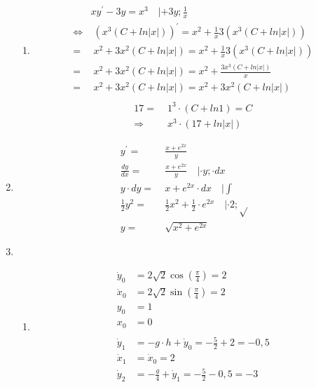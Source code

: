 \documentclass[]{book}
\theoremstyle{definition}
\begin{document}
\begin{enumerate}
\begin{enumerate}
        \item \begin{align*}
            & xy^{\prime} - 3y = x^3 \quad | + 3y ; \frac{1}{x}\\
            \Leftrightarrow & \; (x^3(C + ln |x|))^{\prime} = x^2 + \frac{1}{x} 3(x^3(C + ln |x|)) \\
            = & \; x^2 + 3x^2(C + ln |x|) = x^2 + \frac{1}{x} 3(x^3(C + ln |x|)) \\
            = & \; x^2 + 3x^2(C + ln |x|) = x^2 + \frac{3x^3(C + ln |x|)}{x}  \\
            = & \; x^2 + 3x^2(C + ln |x|) = x^2 + 3x^2(C + ln |x|)  \\
        \end{align*}
        \begin{align*}
            17 = & \; 1^3 \cdot (C + ln 1) = C\\
            \Rightarrow & \; x^3 \cdot (17 + ln |x|) 
        \end{align*}
    \end{enumerate}
    \item \begin{align*}
        y^{\prime} = & \; \frac{x + e^{2x}}{y} \\
        \frac{dy}{dx} = & \; \frac{x + e^{2x}}{y} \quad |\cdot y ; \cdot dx \\
        y \cdot dy = & \; x + e^{2x} \cdot dx \quad |\int \\
        \frac{1}{2} y^2 = & \; \frac{1}{2}x^2 + \frac{1}{2} \cdot e^{2x} \quad |\cdot 2 ; \sqrt{} \\
        y = & \; \sqrt{x^2 + e^{2x}}
    \end{align*}
    \item \begin{enumerate}
        \item \begin{align*}
            \dot{y}_0 & = 2\sqrt{2} \cos(\frac{\pi}{4}) = 2\\
            \dot{x}_0 & = 2\sqrt{2} \sin(\frac{\pi}{4}) = 2\\
            y_0 & = 1 \\
            x_0 & = 0 \\
            \\
            \dot{y}_1 & =  -g \cdot h + \dot{y}_0 = -\frac{5}{2} + 2 = -0,5 \\
            \dot{x}_1 & =  \dot{x}_0 = 2 \\
            \dot{y}_2 & =  -\frac{g}{4} + \dot{y}_1 = -\frac{5}{2} -0,5 = -3 \\

\end{align*}
\end{enumerate}
\end{enumerate}
\end{document}
